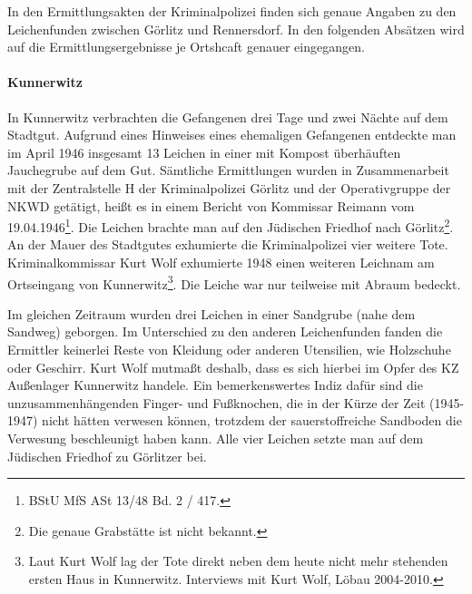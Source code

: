 \documentclass[a4paper,12pt,ngerman,
]{nisebook}
\begin{document}
In den Ermittlungsakten der Kriminalpolizei finden sich genaue Angaben zu den Leichenfunden zwischen Görlitz und Rennersdorf. In den folgenden Absätzen wird auf die Ermittlungsergebnisse je Ortshcaft genauer eingegangen.  

\paragraph{Kunnerwitz\label{kunnerwitz}}



In Kunnerwitz verbrachten die Gefangenen drei Tage und zwei Nächte auf dem Stadtgut. Aufgrund eines Hinweises eines ehemaligen Gefangenen entdeckte man im April 1946 insgesamt 13 Leichen in einer mit Kompost überhäuften Jauchegrube auf dem Gut. \glqq Sämtliche Ermittlungen wurden in Zusammenarbeit mit der Zentralstelle H der Kriminalpolizei Görlitz und der Operativgruppe der NKWD getätigt\grqq, heißt es in einem Bericht von Kommissar Reimann vom 19.04.1946\footnote{BStU MfS ASt 13/48 Bd. 2 / 417.}. Die Leichen brachte man auf den Jüdischen Friedhof nach Görlitz\footnote{Die genaue Grabstätte ist nicht bekannt.}.
\newline
An der Mauer des Stadtgutes exhumierte die Kriminalpolizei vier weitere Tote.
Kriminalkommissar Kurt Wolf exhumierte 1948 einen weiteren Leichnam am Ortseingang von Kunnerwitz\footnote{Laut Kurt Wolf lag der Tote direkt neben dem heute nicht mehr stehenden ersten Haus in Kunnerwitz. Interviews mit Kurt Wolf, Löbau 2004-2010.}. Die Leiche war nur teilweise mit Abraum bedeckt. 

Im gleichen Zeitraum wurden drei Leichen in einer Sandgrube (nahe dem Sandweg) geborgen. Im Unterschied zu den anderen Leichenfunden fanden die Ermittler keinerlei Reste von Kleidung oder anderen Utensilien, wie Holzschuhe oder Geschirr. Kurt Wolf mutmaßt deshalb, dass es sich hierbei im Opfer des KZ Außenlager Kunnerwitz handele. Ein bemerkenswertes Indiz dafür sind die unzusammenhängenden Finger- und Fußknochen, die in der Kürze der Zeit (1945-1947) nicht hätten verwesen können, trotzdem der sauerstoffreiche Sandboden die Verwesung beschleunigt haben kann. Alle vier Leichen setzte man auf dem Jüdischen Friedhof zu Görlitzer bei.
 
\end{document}
